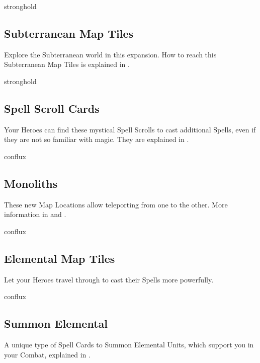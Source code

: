 \begin{multicols*}{2}
\vspace*{1em}
\begin{expansion}{stronghold}
   \subsection*{Subterranean Map Tiles}
   Explore the Subterranean world in this expansion.
   How to reach this Subterranean Map Tiles is explained in .
\end{expansion}

\vspace*{1em}
\begin{expansion}{stronghold}
   \subsection*{Spell Scroll Cards}
   Your Heroes can find these mystical Spell Scrolls to cast additional Spells, even if they are not so familiar with magic.
   They are explained in . %
\end{expansion}

\columnbreak
\begin{expansion}{conflux}
   \subsection*{Monoliths}
   These new Map Locations allow teleporting from one to the other.
   More information in  and .
\end{expansion}

\vspace*{1em}
\begin{expansion}{conflux}
   \subsection*{Elemental Map Tiles}
   Let your Heroes travel through  to cast their Spells more powerfully.
\end{expansion}

\vspace*{1em}
\begin{expansion}{conflux}
   \subsection*{Summon Elemental}
   A unique type of Spell Cards to Summon Elemental Units, which support you in your Combat, explained in .
\end{expansion}


\end{multicols*}
